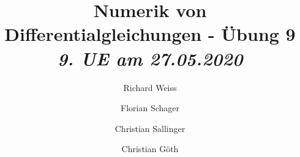 \documentclass{article}
\title
{
  Numerik von Differentialgleichungen - Übung 9 \\
  \vspace{4pt}
  \normalsize
  \textit{9. UE am 27.05.2020}
}
\author
{
  Richard Weiss       \and
  Florian Schager     \and
  Christian Sallinger \and
  Christian Göth
}
\date{}
\begin{document}
\renewcommand{\figurename}{Abbildung}
\maketitle





\FloatBarrier

\end{document}

